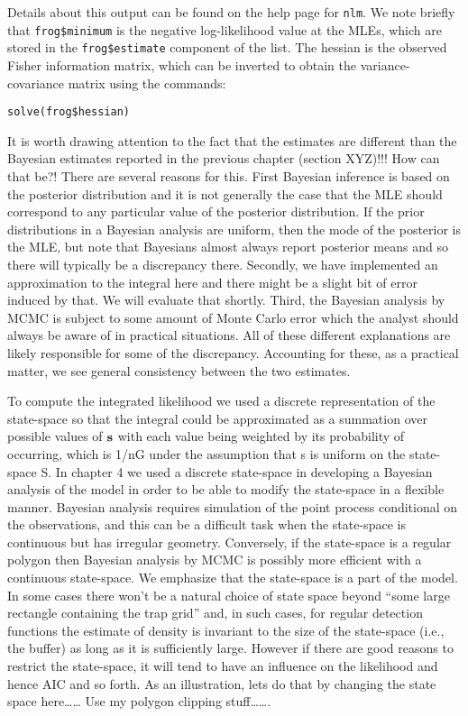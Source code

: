 Details about this output can be found on the help page for \mbox{\tt nlm}. We
note briefly that \mbox{\tt frog\$minimum} is the negative log-likelihood value at
the MLEs, which are stored in the \mbox{\tt frog\$estimate} component of the
list. The hessian is the observed Fisher information matrix, which can
be inverted to obtain the variance-covariance matrix using the
commands:
\begin{verbatim}
solve(frog$hessian)
\end{verbatim}
It is worth drawing attention to the fact that the estimates are
different than the Bayesian estimates reported in the previous chapter
(section XYZ)!!! How can that be?!  There are several reasons for this.
First Bayesian inference is based on the posterior distribution and it
is not generally the case that the MLE should correspond to any
particular value of the posterior distribution. If the prior
distributions in a Bayesian analysis are uniform, then the mode of the
posterior is the MLE,  but note that Bayesians almost always report
posterior means and so there will typically be a discrepancy
there. Secondly, we have implemented an approximation to the integral
here and there might be a slight bit of error induced by that. We
will evaluate that shortly. Third, the Bayesian analysis by MCMC is
subject to some amount of Monte Carlo error which the analyst should
always be aware of in practical situations.  All of these different
explanations are likely responsible for some of the
discrepancy. Accounting for these, as a
practical matter, we see general consistency between the two
estimates. 

To compute the integrated likelihood we used a discrete representation
of the state-space so that the integral could be approximated as a
summation over possible values of ${\bf s}$ with each value being
weighted by its probability of occurring, which is 1/nG under the
assumption that s is uniform on the state-space S. In chapter 4 we
used a discrete state-space in developing a Bayesian analysis of the
model in order to be able to modify the state-space in a flexible
manner. Bayesian analysis requires simulation of the point process
conditional on the observations, and this can be a difficult task when
the state-space is continuous but has irregular geometry.  Conversely,
if the state-space is a regular polygon then Bayesian analysis by MCMC
is possibly more efficient with a continuous state-space. We emphasize
that the state-space is a part of the model. In some cases there won’t
be a natural choice of state space beyond “some large rectangle
containing the trap grid” and, in such cases, for regular detection
functions the estimate of density is invariant to the size of the
state-space (i.e., the buffer) as long as it is sufficiently
large. However if there are good reasons to restrict the state-space,
it will tend to have an influence on the likelihood and hence AIC and
so forth.  As an illustration, lets do that by changing the state
space here…… Use my polygon clipping stuff…….

